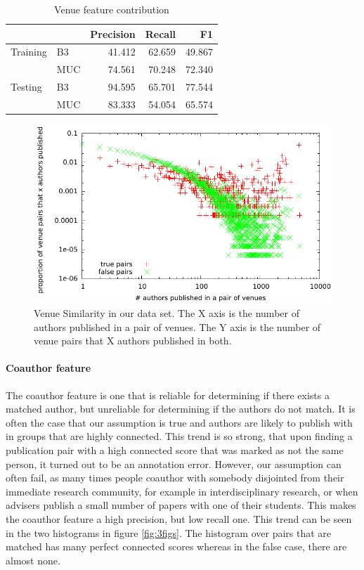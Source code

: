 \documentclass[twocolumn,letterpaper]{article}
\begin{document}
\begin{table}
\begin{tabular}{l || l | r r r}
 & & Precision & Recall & F1 \\ \hline
Training & B3 & 41.412 & 62.659 & 49.867 \\
 & MUC & 74.561 & 70.248 & 72.340\\ \hline
Testing & B3 & 94.595 & 65.701 & 77.544 \\
 & MUC & 83.333 & 54.054 & 65.574 \\
\end{tabular}
\caption{Venue feature contribution}
\label{tab:venue}
\end{table}

\begin{figure}
  \centering
  \includegraphics[width=\columnwidth]{venuestat_dataset}
  \caption{Venue Similarity in our data set.  The X axis is the number of authors published in a pair of venues.  The Y axis is the number of venue pairs that X authors published in both.}
  \label{fig:venuedataset}
\end{figure}

\paragraph{Coauthor feature} %
\label{par:coauthor_feature}
The coauthor feature is one that is reliable for determining if there exists a matched author, but unreliable for determining if the authors do not match. It is often the case that our assumption is true and authors are likely to publish with in groups that are highly connected. This trend is so strong, that upon finding a publication pair with a high connected score that was marked as not the same person, it turned out to be an annotation error. However, our assumption can often fail, as many times people coauthor with somebody disjointed from their immediate research community, for example in interdisciplinary research, or when advisers publish a small number of papers with one of their students. This makes the coauthor feature a high precision, but low recall one. This trend can be seen in the two histograms in figure \ref{fig:3figs}. The histogram over pairs that are matched has many perfect connected scores whereas in the false case, there are almost none. 
\end{document}
